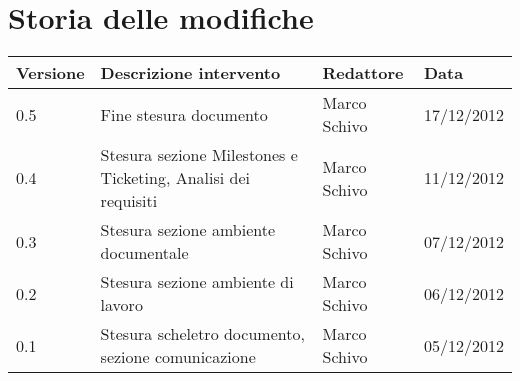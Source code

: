 %

\newcommand{\docName}{Norme di Progetto}
\newcommand{\docFileName}{Norme di Progetto}
\newcommand{\docVers}{1.0}
\newcommand{\creationDate}{05/12/2012}
\newcommand{\modificationDate}{17/12/2012}
\newcommand{\docState}{Approvato}
\newcommand{\docUsage}{Interno}
\newcommand{\docAuthors}{Marco Schivo}
\newcommand{\approvedBy}{}
\newcommand{\verifiedBy}{}
\newcommand{\docRoot}{..}







\section*{Storia delle modifiche}
\begin{tabularx}{\textwidth}{lXll}
\toprule
Versione & Descrizione intervento & Redattore & Data\\
\midrule %
0.5 & Fine stesura documento & Marco Schivo & 17/12/2012\\
0.4 & Stesura sezione Milestones e Ticketing, Analisi dei requisiti & Marco Schivo & 11/12/2012\\
0.3 & Stesura sezione ambiente documentale & Marco Schivo & 07/12/2012\\
0.2 & Stesura sezione ambiente di lavoro & Marco Schivo & 06/12/2012\\
0.1 & Stesura scheletro documento, sezione comunicazione & Marco Schivo & 05/12/2012\\
\bottomrule
\end{tabularx}
\newpage

